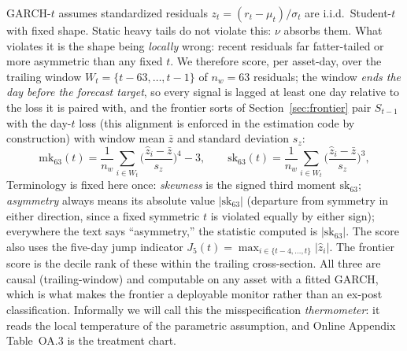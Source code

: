 \documentclass[11pt]{article}
\theoremstyle{remark}
\begin{document}
GARCH-$t$ assumes standardized residuals $z_t = (r_t - \mu_t)/\sigma_t$
are i.i.d.\ Student-$t$ with fixed shape. Static heavy tails do not violate this: $\nu$ absorbs them. What violates it is the shape being
\emph{locally} wrong: recent residuals far fatter-tailed or more
asymmetric than any fixed $t$. We therefore score, per asset-day, over
the trailing window $W_t = \{t-63,\dots,t-1\}$ of $n_w = 63$ residuals; the window \emph{ends the day before the forecast target}, so every signal is lagged at least one day relative to the loss it is paired with, and the frontier sorts of Section~\ref{sec:frontier} pair $S_{t-1}$ with the day-$t$ loss (this alignment is enforced in the estimation code by construction)
with window mean $\bar{z}$ and standard deviation $s_z$:
\begin{equation}
\mathrm{mk}_{63}(t) = \frac{1}{n_w}\sum_{i\in W_t}
\Big(\frac{\widehat{z}_i - \bar{z}}{s_z}\Big)^{4} - 3,
\qquad
\mathrm{sk}_{63}(t) = \frac{1}{n_w}\sum_{i\in W_t}
\Big(\frac{\widehat{z}_i - \bar{z}}{s_z}\Big)^{3},
\label{eq:score}
\end{equation}
Terminology is fixed here once: \emph{skewness} is the signed third
moment $\mathrm{sk}_{63}$; \emph{asymmetry} always means its absolute
value $|\mathrm{sk}_{63}|$ (departure from symmetry in either
direction, since a fixed symmetric $t$ is violated equally by either
sign); everywhere the text says ``asymmetry,'' the statistic computed
is $|\mathrm{sk}_{63}|$. The score also uses the five-day jump indicator
$J_5(t) = \max_{i \in \{t-4,\dots,t\}} |\widehat{z}_i|$. The frontier
score is the decile rank of these within the trailing cross-section.
All three are causal (trailing-window) and computable on any asset with a fitted GARCH, which is what makes the frontier a deployable monitor
rather than an ex-post classification. Informally we will call this the
misspecification \emph{thermometer}: it reads the local temperature of
the parametric assumption, and Online Appendix Table~OA.3 is the treatment
chart.
\end{document}
